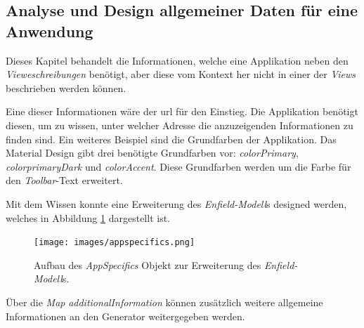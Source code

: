 \subsection{Analyse und Design allgemeiner Daten für eine Anwendung}

Dieses Kapitel behandelt die Informationen, welche eine Applikation neben den \textit{Vieweschreibungen} benötigt, aber diese vom Kontext her nicht in einer der \textit{Views} beschrieben werden können.

Eine dieser Informationen wäre der \acf{url} für den Einstieg. Die Applikation benötigt diesen, um zu wissen, unter welcher Adresse die anzuzeigenden Informationen zu finden sind. Ein weiteres Beispiel sind die Grundfarben der Applikation. Das Material Design gibt drei benötigte Grundfarben vor: \textit{colorPrimary}, \textit{colorprimaryDark} und \textit{colorAccent}. Diese Grundfarben werden um die Farbe für den \textit{Toolbar}-Text erweitert.

Mit dem Wissen konnte eine Erweiterung des \textit{Enfield-Modell}s designed werden, welches in Abbildung \ref{fig:appspecifics} dargestellt ist.

\begin{figure}[H]
	\begin{center}
		\texttt{[image: images/appspecifics.png]}
		\caption{Aufbau des \textit{AppSpecifics} Objekt  zur Erweiterung des \textit{Enfield-Modell}s.}
		\label{fig:appspecifics}
	\end{center}
\end{figure}

Über die \textit{Map} \textit{additionalInformation} können zusätzlich weitere allgemeine Informationen an den Generator weitergegeben werden.
